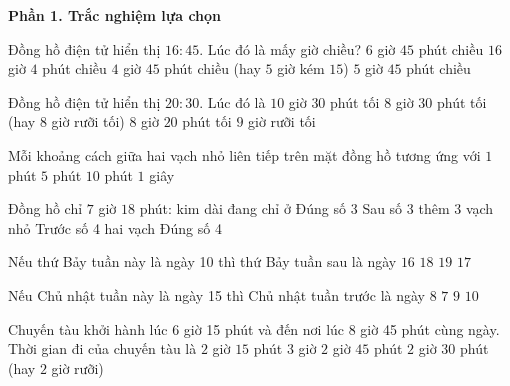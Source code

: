 \textbf{Phần 1. Trắc nghiệm lựa chọn}

\begin{ex} %
Đồng hồ điện tử hiển thị $16:45$. Lúc đó là mấy giờ chiều?
\choice
{$6$ giờ $45$ phút chiều}
{$16$ giờ $4$ phút chiều}
{\True $4$ giờ $45$ phút chiều (hay $5$ giờ kém $15$)}
{$5$ giờ $45$ phút chiều}
\end{ex}

\begin{ex} %
Đồng hồ điện tử hiển thị $20:30$. Lúc đó là
\choice
{$10$ giờ $30$ phút tối}
{\True $8$ giờ $30$ phút tối (hay $8$ giờ rưỡi tối)}
{$8$ giờ $20$ phút tối}
{$9$ giờ rưỡi tối}
\end{ex}

\begin{ex} %
Mỗi khoảng cách giữa hai vạch nhỏ liên tiếp trên mặt đồng hồ tương ứng với
\choice
{\True $1$ phút}
{$5$ phút}
{$10$ phút}
{$1$ giây}
\end{ex}

\begin{ex} %
Đồng hồ chỉ $7$ giờ $18$ phút: kim dài đang chỉ ở
\choice
{Đúng số 3}
{\True Sau số 3 thêm 3 vạch nhỏ}
{Trước số 4 hai vạch}
{Đúng số 4}
\end{ex}

\begin{ex} %
Nếu thứ Bảy tuần này là ngày 10 thì thứ Bảy tuần sau là ngày
\choice
{$16$}
{$18$}
{$19$}
{\True $17$}
\end{ex}

\begin{ex} %
Nếu Chủ nhật tuần này là ngày 15 thì Chủ nhật tuần trước là ngày
\choice
{\True $8$}
{$7$}
{$9$}
{$10$}
\end{ex}

\begin{ex} %
Chuyến tàu khởi hành lúc 6 giờ 15 phút và đến nơi lúc 8 giờ 45 phút cùng ngày. Thời gian đi của chuyến tàu là
\choice
{$2$ giờ $15$ phút}
{$3$ giờ}
{$2$ giờ $45$ phút}
{\True $2$ giờ $30$ phút (hay $2$ giờ rưỡi)}
\end{ex}

